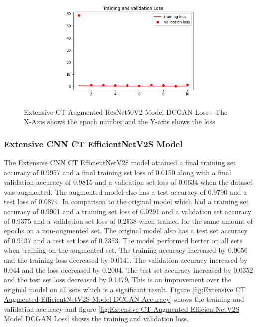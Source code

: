  \begin{figure}[H]
    \centering
    \includegraphics[width=1\textwidth,height=5cm,keepaspectratio]{Images/ResNet50V2BaselineTrainingValidationLossExtensiveCTAugmentedDCGAN.png}\\
    \caption{Extensive CT Augmented ResNet50V2 Model DCGAN Loss - The X-Axis shows the epoch number and the Y-axis shows the loss}
    \label{fig:Extensive CT Augmented ResNet50V2 Model DCGAN Loss}
\end{figure}
\subsubsection{Extensive CNN CT EfficientNetV2S Model}
The Extensive CNN CT EfficientNetV2S model attained a final training set accuracy of 0.9957 and a final training set loss of 0.0150 along with a final validation accuracy of 0.9815 and a validation set loss of 0.0634  when the dataset was augmented.  The augmented model also has a test accuracy of 0.9790 and a test loss of 0.0874.  In comparison to the original model which had a training set accuracy of 0.9901 and a training set loss of 0.0291 and a validation set accuracy of 0.9375 and a validation set loss of 0.2638 when trained for the same amount of epochs on a non-augmented set.  The original model also has a test set accuracy of 0.9437 and a test set loss of 0.2353.  The model performed better on all sets when training on the augmented set.  The training accuracy increased by 0.0056 and the training loss decreased by 0.0141. The validation accuracy increased by 0.044 and the loss decreased by 0.2004.  The test set accuracy increased by 0.0352 and the test set loss decreased by 0.1479.  This is an improvement over the original model on all sets which is a significant result.  Figure \ref{fig:Extensive CT Augmented EfficientNetV2S Model DCGAN Accuracy} shows the training and validation accuracy and figure \ref{fig:Extensive CT Augmented EfficientNetV2S Model DCGAN Loss} shows the training and validation loss.

